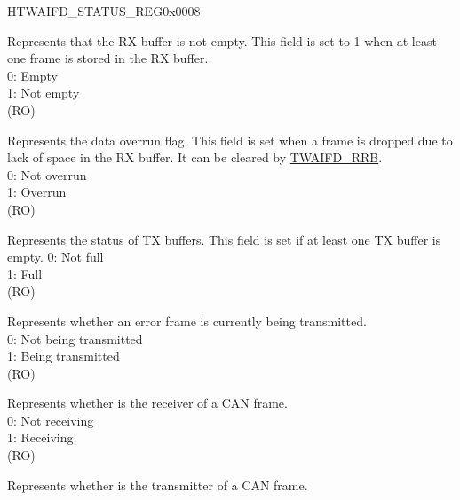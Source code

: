 \begin{register}{H}{TWAIFD\_STATUS\_REG}{0x0008}\label{regdesc:TWAIFDSTATUSREG}
%
%
%
%
%
%
%
%
%
%
%
%
%
%
%
%
\regnewline%
\begin{regdesc}\begin{reglist}
\label{fielddesc:TWAIFDRXNE}\item [TWAIFD\_RXNE] Represents that the RX buffer is not empty. This field is set to 1 when at least one frame is stored in the RX buffer.\\
0: Empty\\
1: Not empty\\(RO)
\label{fielddesc:TWAIFDDOR}\item [TWAIFD\_DOR] Represents the data overrun flag. This field is set when a frame is dropped due to lack of space in the RX buffer. It can be cleared by \hyperref[fielddesc:TWAIFDRRB]{TWAIFD\_RRB}.\\
0: Not overrun\\
1: Overrun\\(RO)
\label{fielddesc:TWAIFDTXNF}\item [TWAIFD\_TXNF] Represents the status of TX buffers. This field is set if at least one TX buffer is empty.
0: Not full\\
1: Full\\(RO)
\label{fielddesc:TWAIFDEFT}\item [TWAIFD\_EFT] Represents whether an error frame is currently being transmitted.\\
0: Not being transmitted\\
1: Being transmitted\\(RO)
\label{fielddesc:TWAIFDRXS}\item [TWAIFD\_RXS] Represents whether \modulename is the receiver of a CAN frame.\\
0: Not receiving\\
1: Receiving\\(RO)
\label{fielddesc:TWAIFDTXS}\item [TWAIFD\_TXS] Represents whether \modulename is the transmitter of a CAN frame.\\

\end{reglist}
\end{regdesc}
\end{register}
